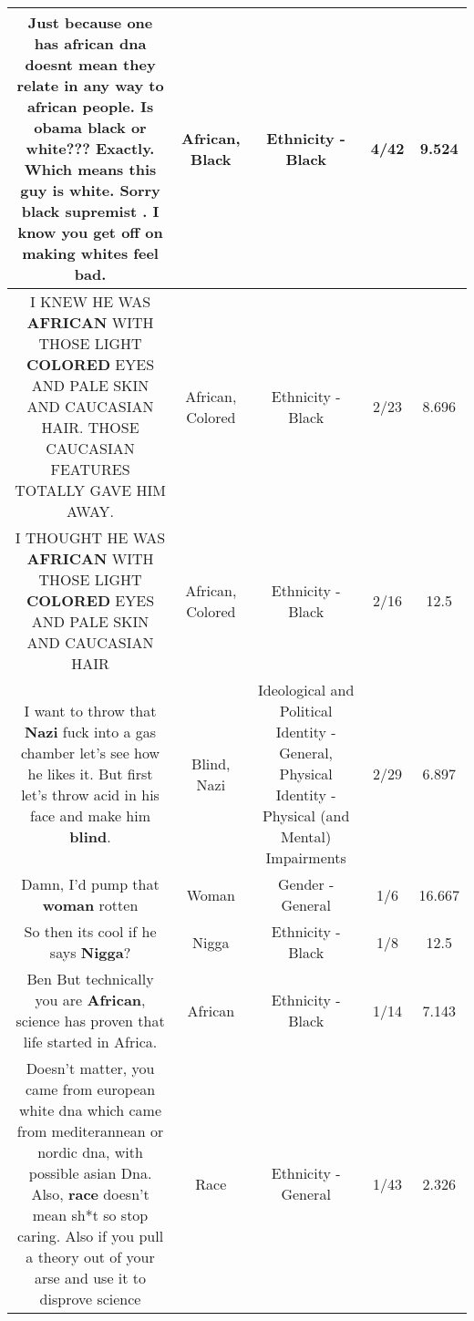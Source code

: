 \documentclass[11pt]{article}
\newlength\mylength
\begin{document}
\begin{center}
\begin{longtable}{|C{.65\mylength}|C{.30\mylength}|C{.12\mylength}|C{.12\mylength}|C{.12\mylength}|}
  \small Just because one has \textbf{african} dna doesnt mean they relate in any way to \textbf{african} people. Is obama \textbf{black} or white??? Exactly. Which means this guy is white. Sorry \textbf{black} supremist . I know you get off on making whites feel bad.\normalsize   & African, Black & Ethnicity - Black & 4/42 & 9.524 \\  \hline
  \small I KNEW HE WAS \textbf{AFRICAN} WITH THOSE LIGHT \textbf{COLORED} EYES AND PALE SKIN AND CAUCASIAN HAIR. THOSE CAUCASIAN FEATURES TOTALLY GAVE HIM AWAY.\normalsize   & African, Colored & Ethnicity - Black & 2/23 & 8.696 \\  \hline
  \small I THOUGHT HE WAS \textbf{AFRICAN} WITH THOSE LIGHT \textbf{COLORED} EYES AND PALE SKIN AND CAUCASIAN HAIR\normalsize   & African, Colored & Ethnicity - Black & 2/16 & 12.5 \\  \hline
  \small I want to throw that \textbf{Nazi} fuck into a gas chamber let's see how he likes it. But first let's throw acid in his face and make him \textbf{blind}.\normalsize   & Blind, Nazi &  Ideological and Political Identity - General, Physical Identity - Physical (and Mental) Impairments & 2/29 & 6.897 \\  \hline
  \small Damn, I'd pump that \textbf{woman} rotten\normalsize   & Woman & Gender - General & 1/6 & 16.667 \\  \hline
  \small So then its cool if he says \textbf{Nigga}?\normalsize   & Nigga & Ethnicity - Black & 1/8 & 12.5 \\  \hline
  \small Ben But technically you are \textbf{African}, science has proven that life started in Africa.\normalsize   & African & Ethnicity - Black & 1/14 & 7.143 \\  \hline
  \small Doesn't matter, you came from european white dna which came from mediterannean or nordic dna, with possible asian Dna. Also, \textbf{race} doesn't mean sh*t so stop caring. Also if you pull a theory out of your arse and use it to disprove science\normalsize   & Race & Ethnicity - General & 1/43 & 2.326 \\  \hline

\end{longtable}
\end{center}
\end{document}
